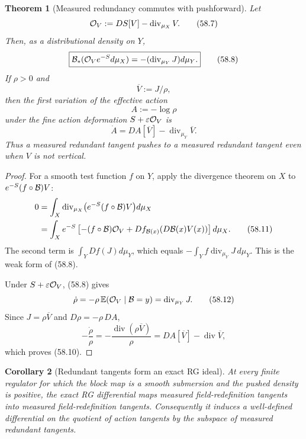 \documentclass[11pt,oneside]{book}
\newtheorem{theorem}{Theorem}[chapter]
\newtheorem{corollary}[theorem]{Corollary}
\theoremstyle{definition}
\theoremstyle{remark}
\begin{document}
\begin{theorem}[Measured redundancy commutes with pushforward]
\label{thm:e8v58-pushforward-redundancy}
Let
\[
 {\cal O}_V:=DS[V]-\operatorname{div}_{\mu_X}V.               \tag{58.7}
\]
Then, as a distributional density on \(Y\),
\[
 \boxed{
 {\cal B}_*({\cal O}_Ve^{-S}d\mu_X)
 =-(\operatorname{div}_{\mu_Y}J)d\mu_Y.}                      \tag{58.8}
\]
If \(\rho>0\) and
\[
 \overline V:=J/\rho,                                        \tag{58.9}
\]
then the first variation of the effective action
\[
 A:=-\log\rho
\]
under the fine action deformation \(S+\varepsilon{\cal O}_V\) is
\[
 \boxed{
 \dot A
 =DA[\overline V]-\operatorname{div}_{\mu_Y}\overline V.}     \tag{58.10}
\]
Thus a measured redundant tangent pushes to a measured redundant
tangent even when \(V\) is not vertical.
\end{theorem}

\begin{proof}
For a smooth test function \(f\) on \(Y\), apply the divergence
theorem on \(X\) to \(e^{-S}(f\circ{\cal B})V\):
\[
\begin{split}
 0
 &=\int_X\operatorname{div}_{\mu_X}
 \bigl(e^{-S}(f\circ{\cal B})V\bigr)d\mu_X\\
 &=\int_Xe^{-S}\left[
 -(f\circ{\cal B}){\cal O}_V
 +Df_{{\cal B}(x)}(D{\cal B}(x)V(x))\right]d\mu_X.
                                                                    \tag{58.11}
\end{split}
\]
The second term is \(\int_YDf(J)d\mu_Y\), which equals
\(-\int_Yf\operatorname{div}_{\mu_Y}J\,d\mu_Y\).
This is the weak form of (58.8).

Under \(S+\varepsilon{\cal O}_V\), (58.8) gives
\[
 \dot\rho
 =-\rho\,\mathbb E({\cal O}_V\mid{\cal B}=y)
 =\operatorname{div}_{\mu_Y}J.                               \tag{58.12}
\]
Since \(J=\rho\overline V\) and \(D\rho=-\rho\,DA\),
\[
 -\frac{\dot\rho}{\rho}
 =-\frac{\operatorname{div}(\rho\overline V)}{\rho}
 =DA[\overline V]-\operatorname{div}\overline V,
\]
which proves (58.10).
\end{proof}

\begin{corollary}[Redundant tangents form an exact RG ideal]
\label{cor:e8v58-redundant-ideal}
At every finite regulator for which the block map is a smooth
submersion and the pushed density is positive, the exact RG
differential maps measured field-redefinition tangents into
measured field-redefinition tangents.  Consequently it induces a
well-defined differential on the quotient of action tangents by
the subspace of measured redundant tangents.
\end{corollary}
\end{document}
